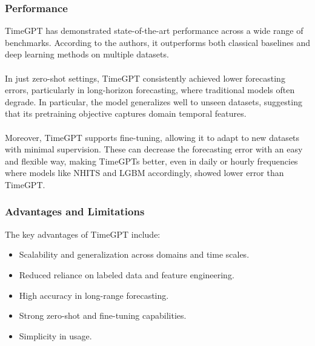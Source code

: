 \documentclass{article}
\begin{document}
\subsubsection{Performance}
TimeGPT has demonstrated state-of-the-art performance across a wide range of benchmarks. According to the authors, it outperforms both classical baselines and deep learning methods on multiple datasets.\\
\\
In just zero-shot settings, TimeGPT consistently achieved lower forecasting errors, particularly in long-horizon forecasting, where traditional models often degrade. In particular, the model generalizes well to unseen datasets, suggesting that its pretraining objective captures domain temporal features.\\
\\
Moreover, TimeGPT supports fine-tuning, allowing it to adapt to new datasets with minimal supervision. These can decrease the forecasting error with an easy and flexible way, making TimeGPTs better, even in daily or hourly frequencies where models like NHITS and LGBM accordingly, showed lower error than TimeGPT.

\subsubsection{Advantages and Limitations}
The key advantages of TimeGPT include:

\begin{itemize}
    \item Scalability and generalization across domains and time scales.
\end{itemize}

\begin{itemize}
    \item Reduced reliance on labeled data and feature engineering.
\end{itemize}

\begin{itemize}
    \item High accuracy in long-range forecasting.
\end{itemize}

\begin{itemize}
    \item Strong zero-shot and fine-tuning capabilities.
\end{itemize}

\begin{itemize}
    \item Simplicity in usage.
\end{itemize}
\end{document}
